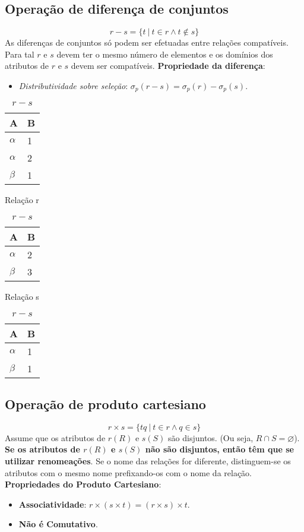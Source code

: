 \documentclass{article}
\begin{document}
\subsection{Operação de diferença de conjuntos}
\[
  r - s=\{t \ | \ t \in r \wedge t \notin s\}
\]
As diferenças de conjuntos só podem ser efetuadas entre relações compatíveis. Para tal $r$ e $s$ devem ter o mesmo número de elementos e os domínios dos atributos de $r$ e $s$ devem ser compatíveis.
\textbf{Propriedade da diferença}:
\begin{itemize}
  \item \textit{Distributividade sobre seleção}: $\sigma_p(r - s) = \sigma_p(r) - \sigma_p(s)$.
\end{itemize}

\begin{table}[ht]
  \parbox{.30\linewidth}{
    \centering
    \begin{tabular}{|l|l|}
      \hline
      A        & B \\ \hline
      $\alpha$ & 1 \\ \hline
      $\alpha$ & 2 \\ \hline
      $\beta$  & 1 \\ \hline
    \end{tabular}
    \caption{Relação r}
  }
  \hfill
  \parbox{.30\linewidth}{
    \centering
    \begin{tabular}{|l|l|}
      \hline
      A        & B \\ \hline
      $\alpha$ & 2 \\ \hline
      $\beta$  & 3 \\ \hline
    \end{tabular}
    \caption{Relação s}
  }
  \hfill
  \parbox{.30\linewidth}{
    \centering
    \begin{tabular}{|l|l|}
      \hline
      A        & B \\ \hline
      $\alpha$ & 1 \\ \hline
      $\beta$  & 1 \\ \hline
    \end{tabular}
    \caption{$r - s$}
  }
\end{table}

\pagebreak

\subsection{Operação de produto cartesiano}
\[
  r \times s = \{tq \ | \ t \in r \wedge q \in s\}
\]
Assume que os atributos de $r(R)$ e $s(S)$ são disjuntos. (Ou seja, $R \cap S = \varnothing$). \textbf{Se os atributos de $r(R)$ e $s(S)$ não são disjuntos, então têm que se utilizar renomeações}. Se o nome das relações for diferente, distinguem-se os atributos com o mesmo nome prefixando-os com o nome da relação.\\
\textbf{Propriedades do Produto Cartesiano}:
\begin{itemize}
  \item \textbf{Associatividade}: $r \times (s \times t) = (r \times s) \times t$.
  \item \textbf{Não é Comutativo}.
\end{itemize}
\end{document}
